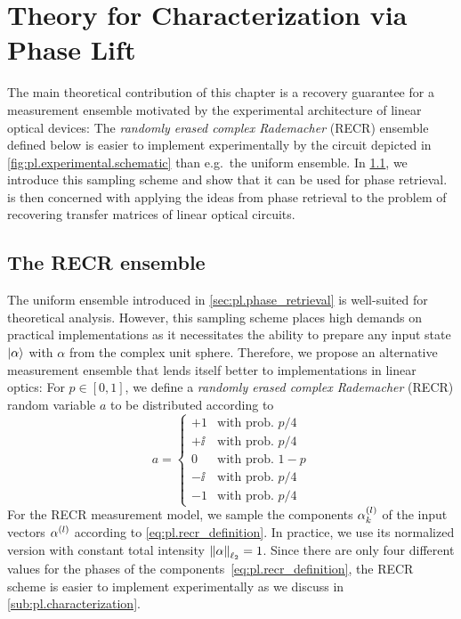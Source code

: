 \section{Theory for Characterization via Phase Lift}%
\label{sec:pl.theory}

The main theoretical contribution of this chapter is a recovery guarantee for a measurement ensemble motivated by the experimental architecture of linear optical devices:
The \emph{randomly erased complex Rademacher} (RECR) ensemble defined below is easier to implement experimentally by the circuit depicted in \cref{fig:pl.experimental.schematic} than e.g.\ the uniform ensemble.
In \cref{sub:pl.recr}, we introduce this sampling scheme and show that it can be used for phase retrieval.
 is then concerned with applying the ideas from phase retrieval to the problem of recovering transfer matrices of linear optical circuits.

\subsection{The RECR ensemble}%
\label{sub:pl.recr}

The uniform ensemble introduced in \cref{sec:pl.phase_retrieval} is well-suited for theoretical analysis.
However, this sampling scheme places high demands on practical implementations as it necessitates the ability to prepare any input state $\ket{\alpha}$ with $\alpha$ from the complex unit sphere.
Therefore, we propose an alternative measurement ensemble that lends itself better to implementations in linear optics:
For $p \in [0,1]$, we define a \emph{randomly erased complex Rademacher} (RECR) random variable $a$ to be distributed according to
\[
  a =
  \begin{cases}
    +1 & \textrm{with prob. } p/4 \\
    +\ii & \textrm{with prob. } p/4 \\
    0 & \textrm{with prob. } 1-p \\
    -\ii & \textrm{with prob. } p/4 \\
    -1 & \textrm{with prob. } p/4
  \end{cases}
  \label{eq:pl.recr_definition}
\]
For the RECR measurement model, we sample the components $\alpha^{(l)}_k$ of the input vectors $\alpha^{(l)}$ according to \cref{eq:pl.recr_definition}.
In practice, we use its normalized version with constant total intensity ${\Vert\alpha\Vert}_{\ell_2} = 1$.
Since there are only four different values for the phases of the components~\eqref{eq:pl.recr_definition}, the RECR scheme is easier to implement experimentally as we discuss in \cref{sub:pl.characterization}.\\



